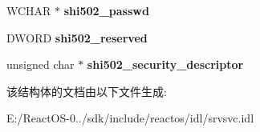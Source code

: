 \begin{DoxyCompactItemize}
\mbox{\label{struct___s_h_a_r_e___i_n_f_o__502___i_a1854929a618713ac7e8cdf9f470c62dc}} 
W\+C\+H\+AR $\ast$ {\bfseries shi502\+\_\+passwd}
\item 
\mbox{\label{struct___s_h_a_r_e___i_n_f_o__502___i_a382bb929a11ae98542f2bff6ffdb5633}} 
D\+W\+O\+RD {\bfseries shi502\+\_\+reserved}
\item 
\mbox{\label{struct___s_h_a_r_e___i_n_f_o__502___i_ae4719e185446d78cacac8ccdb0235be5}} 
unsigned char $\ast$ {\bfseries shi502\+\_\+security\+\_\+descriptor}
\end{DoxyCompactItemize}


该结构体的文档由以下文件生成\+:\begin{DoxyCompactItemize}
\item 
E\+:/\+React\+O\+S-\/0../sdk/include/reactos/idl/srvsvc.\+idl\end{DoxyCompactItemize}
